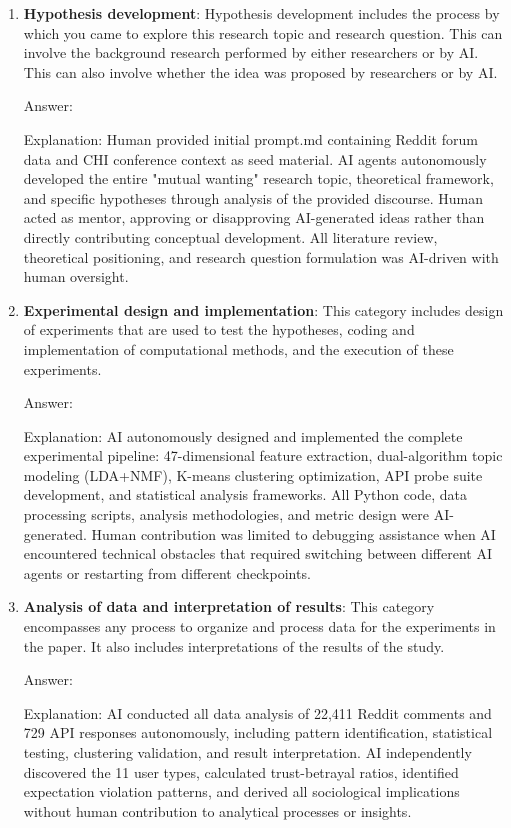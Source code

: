\documentclass{article}
\begin{document}
\begin{enumerate}
    \item \textbf{Hypothesis development}: Hypothesis development includes the process by which you came to explore this research topic and research question. This can involve the background research performed by either researchers or by AI. This can also involve whether the idea was proposed by researchers or by AI. 

    Answer: \involvementB{} 
    
    Explanation: Human provided initial prompt.md containing Reddit forum data and CHI conference context as seed material. AI agents autonomously developed the entire "mutual wanting" research topic, theoretical framework, and specific hypotheses through analysis of the provided discourse. Human acted as mentor, approving or disapproving AI-generated ideas rather than directly contributing conceptual development. All literature review, theoretical positioning, and research question formulation was AI-driven with human oversight.

    \item \textbf{Experimental design and implementation}: This category includes design of experiments that are used to test the hypotheses, coding and implementation of computational methods, and the execution of these experiments. 

    Answer: \involvementB{} 
    
    Explanation: AI autonomously designed and implemented the complete experimental pipeline: 47-dimensional feature extraction, dual-algorithm topic modeling (LDA+NMF), K-means clustering optimization, API probe suite development, and statistical analysis frameworks. All Python code, data processing scripts, analysis methodologies, and metric design were AI-generated. Human contribution was limited to debugging assistance when AI encountered technical obstacles that required switching between different AI agents or restarting from different checkpoints.

    \item \textbf{Analysis of data and interpretation of results}: This category encompasses any process to organize and process data for the experiments in the paper. It also includes interpretations of the results of the study.
 
    Answer: \involvementA{} 
    
    Explanation: AI conducted all data analysis of 22,411 Reddit comments and 729 API responses autonomously, including pattern identification, statistical testing, clustering validation, and result interpretation. AI independently discovered the 11 user types, calculated trust-betrayal ratios, identified expectation violation patterns, and derived all sociological implications without human contribution to analytical processes or insights.


\end{enumerate}
\end{document}
